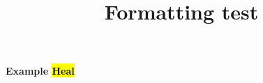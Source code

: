 \documentclass{article}
\title{Formatting test}
\date{}
\begin{document}
\maketitle
\textbf{Example \hl{Heal}}
\end{document}
